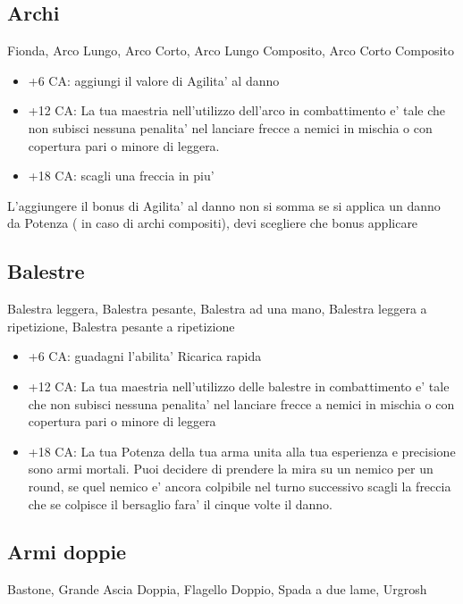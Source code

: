 \documentclass[a4paper,11pt,twoside,openany]{book}
\begin{document}
\subsection{Archi} Fionda, Arco Lungo, Arco Corto, Arco Lungo Composito, Arco Corto Composito

\begin{itemize}

\item +6 CA: aggiungi il valore di Agilita' al danno

\item +12 CA: La tua maestria nell'utilizzo dell'arco in combattimento e' tale che non subisci nessuna penalita' nel lanciare frecce a nemici in mischia o con copertura pari o minore di leggera.

\item +18 CA: scagli una freccia in piu'

\end{itemize}

L'aggiungere il bonus di Agilita' al danno non si somma se si applica un danno da Potenza ( in caso di archi compositi), devi scegliere che bonus applicare

\subsection{Balestre}Balestra leggera, Balestra pesante, Balestra ad una mano, Balestra leggera a ripetizione, Balestra pesante a ripetizione

\begin{itemize}

\item +6 CA: guadagni l'abilita' Ricarica rapida

\item +12 CA: La tua maestria nell'utilizzo delle balestre in combattimento e' tale che non subisci nessuna penalita' nel lanciare frecce a nemici in mischia o con copertura pari o minore di leggera

\item +18 CA: La tua Potenza della tua arma unita alla tua esperienza e precisione sono armi mortali. Puoi decidere di prendere la mira su un nemico per un round, se quel nemico e' ancora colpibile nel turno successivo scagli la freccia che se colpisce il bersaglio fara' il cinque volte il danno.

\end{itemize}

\subsection{Armi doppie} Bastone, Grande Ascia Doppia, Flagello Doppio, Spada a due lame, Urgrosh
\end{document}
